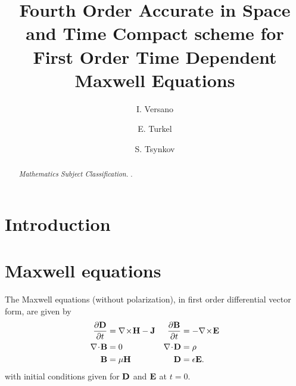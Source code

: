 \documentclass[12pt,reqno]{amsart}
\theoremstyle{definition}
\numberwithin{equation}{section}
\begin{document}
	
	
	\title{Fourth Order Accurate in Space and Time Compact scheme for First Order Time Dependent Maxwell Equations}
	
	\author {I. Versano}
	
	\address {School of Mathematical Sciences, Tel-Aviv University, Tel-Aviv 6997801, Israel}
	
	
	\author {E. Turkel}
	
	\address {School of Mathematical Sciences, Tel-Aviv University, Tel-Aviv 6997801, Israel}
	
	
	\author {S. Tsynkov }
	
	\address {North Carolina State University, Box 8205, Raleigh, NC 27695, USA.}
	
	
	
	
	
	
	
	
	
	\maketitle
	\begin{abstract}
		
		
		\medskip
		
		  \! {\em Mathematics  Subject  Classification.}
		.\\[1mm]
	\end{abstract}
	
	\section{Introduction}
	
	\section{Maxwell equations}
	The Maxwell equations (without polarization), in first order differential vector form, are given by
	\begin{align}
		\label{eq:maxwellv}
		\frac{\partial \bf{D}}{\partial t} &= \nabla \!\times\! \bf{H} - \bf{J}  & \frac{\partial \bf{B}}{\partial t} &= - \nabla \!\times\! \bf{E} \notag \\
		\nabla \!\cdot\! \bf{B} &= 0 & \nabla \!\cdot\! \bf{D} &= \rho \\
		\bf{B} &= \mu \bf{H} & \bf{D} &= \epsilon \bf{E}. \notag
	\end{align}
	with initial conditions given for $\bf{D}$ and $\bf{E}$ at $t=0$.
\end{document}
